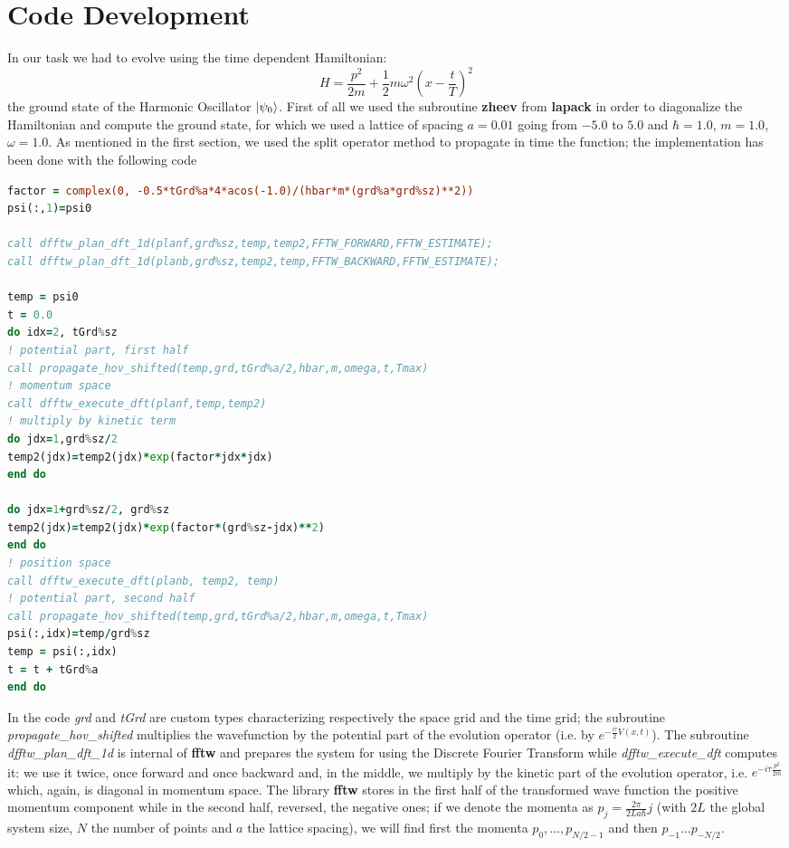 \documentclass{article}
\begin{document}
\section*{Code Development}
In our task we had to evolve using the time dependent Hamiltonian:
\begin{equation}
	H=\frac{p^2}{2m}+\frac{1}{2} m \omega^2 \left(x-\frac{t}{T}\right)^2
\end{equation}
the ground state of the Harmonic Oscillator $\ket{\psi_0}$. First of all we used the subroutine \textbf{zheev} from \textbf{lapack} in order to diagonalize the Hamiltonian and compute the ground state, for which we used a lattice of spacing $a=0.01$ going from $-5.0$ to $5.0$ and  $\hbar=1.0$, $m=1.0$, $\omega=1.0$. As mentioned in the first section, we used the split operator method to propagate in time the function; the implementation has been done with the following code
\begin{small}
\begin{lstlisting}[language=Fortran]
factor = complex(0, -0.5*tGrd%a*4*acos(-1.0)/(hbar*m*(grd%a*grd%sz)**2))
psi(:,1)=psi0

call dfftw_plan_dft_1d(planf,grd%sz,temp,temp2,FFTW_FORWARD,FFTW_ESTIMATE);
call dfftw_plan_dft_1d(planb,grd%sz,temp2,temp,FFTW_BACKWARD,FFTW_ESTIMATE);

temp = psi0
t = 0.0
do idx=2, tGrd%sz
! potential part, first half
call propagate_hov_shifted(temp,grd,tGrd%a/2,hbar,m,omega,t,Tmax)
! momentum space
call dfftw_execute_dft(planf,temp,temp2)
! multiply by kinetic term
do jdx=1,grd%sz/2
temp2(jdx)=temp2(jdx)*exp(factor*jdx*jdx)
end do

do jdx=1+grd%sz/2, grd%sz
temp2(jdx)=temp2(jdx)*exp(factor*(grd%sz-jdx)**2)
end do
! position space	
call dfftw_execute_dft(planb, temp2, temp)
! potential part, second half
call propagate_hov_shifted(temp,grd,tGrd%a/2,hbar,m,omega,t,Tmax)
psi(:,idx)=temp/grd%sz
temp = psi(:,idx)
t = t + tGrd%a
end do
\end{lstlisting}
\end{small}
In the code \textit{grd} and \textit{tGrd} are custom types characterizing respectively the space grid and the time grid; the subroutine \textit{propagate\_hov\_shifted} multiplies the wavefunction by the potential part of the evolution operator (i.e. by $e^{-\frac{i\tau}{2}V(x,t)}$). The subroutine \textit{dfftw\_plan\_dft\_1d} is internal of \textbf{fftw} and prepares the system for using the Discrete Fourier Transform while \textit{dfftw\_execute\_dft} computes it: we use it twice, once forward and once backward and, in the middle, we multiply by the kinetic part of the evolution operator, i.e. $e^{-i\tau \frac{p^2}{2m}}$ which, again, is diagonal in momentum space. The library \textbf{fftw} stores in the first half of the transformed wave function the positive momentum component while in the second half, reversed, the negative ones; if we denote the momenta as $p_j=\frac{2\pi}{2La \hbar} j$ (with $2L$ the global system size, $N$ the number of points and $a$ the lattice spacing), we will find first the momenta $p_0, \dots, p_{N/2-1}$ and then $p_{-1} \dots p_{-N/2}$.
\newpage
\end{document}
